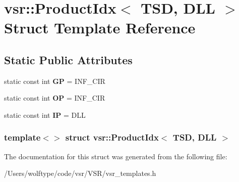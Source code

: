 \hypertarget{structvsr_1_1_product_idx_3_01_t_s_d_00_01_d_l_l_01_4}{\section{vsr\-:\-:Product\-Idx$<$ T\-S\-D, D\-L\-L $>$ Struct Template Reference}
\label{structvsr_1_1_product_idx_3_01_t_s_d_00_01_d_l_l_01_4}
}
\subsection*{Static Public Attributes}
\begin{DoxyCompactItemize}
\item 
\hypertarget{structvsr_1_1_product_idx_3_01_t_s_d_00_01_d_l_l_01_4_a624dd1a3914b0895ccf59065bec49f12}{static const int {\bfseries G\-P} = I\-N\-F\-\_\-\-C\-I\-R}\label{structvsr_1_1_product_idx_3_01_t_s_d_00_01_d_l_l_01_4_a624dd1a3914b0895ccf59065bec49f12}

\item 
\hypertarget{structvsr_1_1_product_idx_3_01_t_s_d_00_01_d_l_l_01_4_a17c85661d99e875f6dc05a1a55e39a28}{static const int {\bfseries O\-P} = I\-N\-F\-\_\-\-C\-I\-R}\label{structvsr_1_1_product_idx_3_01_t_s_d_00_01_d_l_l_01_4_a17c85661d99e875f6dc05a1a55e39a28}

\item 
\hypertarget{structvsr_1_1_product_idx_3_01_t_s_d_00_01_d_l_l_01_4_ac78351e17517f0d8ad377192a1191127}{static const int {\bfseries I\-P} = D\-L\-L}\label{structvsr_1_1_product_idx_3_01_t_s_d_00_01_d_l_l_01_4_ac78351e17517f0d8ad377192a1191127}

\end{DoxyCompactItemize}
\subsubsection*{template$<$$>$ struct vsr\-::\-Product\-Idx$<$ T\-S\-D, D\-L\-L $>$}



The documentation for this struct was generated from the following file\-:\begin{DoxyCompactItemize}
\item 
/\-Users/wolftype/code/vsr/\-V\-S\-R/vsr\-\_\-templates.\-h\end{DoxyCompactItemize}
